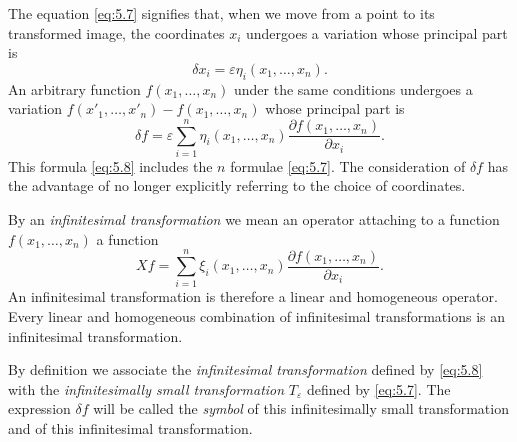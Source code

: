 \documentclass[leqno,11pt]{book}
\makeatletter
\numberwithin{equation}{chapter}
\newcommand{\pd}{\partial}
\theoremstyle{shape1}
\theoremstyle{shapesmall}
\let\old@epsilon\epsilon
\let\old@varepsilon\varepsilon
\let\epsilon\old@varepsilon
\let\varepsilon\old@epsilon
\newcommand{\somespace}{\vspace{9pt}}
\makeatother
\begin{document}
The equation \eqref{eq:5.7} signifies that, when we move from a point to its transformed image, the coordinates $x_{i}$ undergoes a variation whose principal part is
\[
\delta x_{i}=\epsilon\eta_{i}(x_{1},\dots,x_{n}).
\]
An arbitrary function $f(x_{1},\dots,x_{n})$ under the same conditions undergoes a variation $f(x'_{1},\dots,x'_{n})-f(x_{1},\dots,x_{n})$ whose principal part is
\begin{equation}
  \label{eq:5.8}
  \delta f=\epsilon\sum_{i=1}^{n}\eta_{i}(x_{1},\dots,x_{n})\frac{\pd f(x_{1},\dots,x_{n})}{\pd x_{i}}.
\end{equation}
This formula \eqref{eq:5.8} includes the $n$ formulae \eqref{eq:5.7}. The consideration of $\delta f$ has the advantage of no longer explicitly referring to the choice of coordinates.

By an \emph{infinitesimal transformation} we mean an operator attaching to a function $f(x_{1},\dots,x_{n})$ a function
\[
Xf=\sum_{i=1}^{n}\xi_{i}(x_{1},\dots,x_{n})\frac{\pd f(x_{1},\dots,x_{n})}{\pd x_{i}}.
\]
An infinitesimal transformation is therefore a linear and homogeneous operator. Every linear and homogeneous combination of infinitesimal transformations is an infinitesimal transformation.

By definition we associate the \emph{infinitesimal transformation} defined by \eqref{eq:5.8} with the \emph{infinitesimally small transformation} $T_{\epsilon}$ defined by \eqref{eq:5.7}. The expression $\delta f$ will be called the \emph{symbol} of this infinitesimally small transformation and of this infinitesimal transformation.

\somespace
\end{document}
